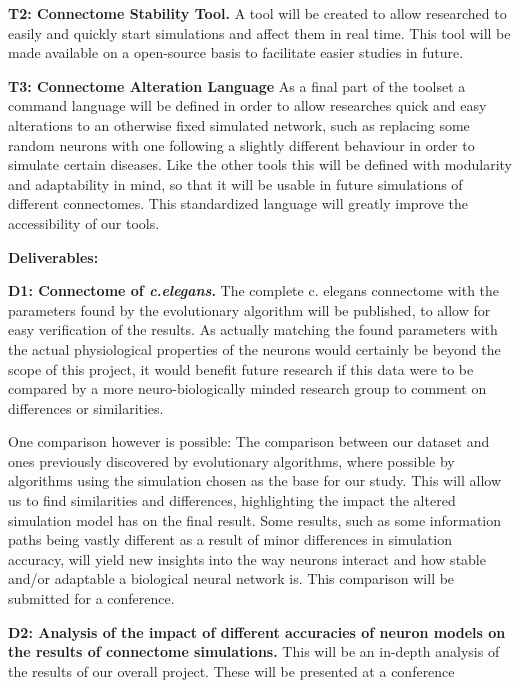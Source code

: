 \documentclass[a4paper,11pt]{article}
\begin{document}
\textbf{T2: Connectome Stability Tool.}
A tool will be created to allow researched to easily and quickly start simulations and affect them in real time. This tool will be made available on a open-source  basis to facilitate easier studies in future. 

\textbf{T3: Connectome Alteration Language}
As a final part of the toolset a command language will be defined in order to allow researches quick and easy alterations to an otherwise fixed simulated network, such as replacing some random neurons with one following a slightly different behaviour in order to simulate certain diseases. Like the other tools this will be defined with modularity and adaptability in mind, so that it will be usable in future simulations of different connectomes. This standardized language will greatly improve the accessibility of our tools.

\textbf{Deliverables:} 

\textbf{D1: Connectome of \emph{c.elegans}.}
The complete c. elegans connectome with the parameters found by the evolutionary algorithm will be published, to allow for easy verification of the results. As actually matching the found parameters with the actual physiological properties of the neurons would certainly be beyond the scope of this project, it would benefit future research if this data were to be compared by a more neuro-biologically minded research group to comment on differences or similarities. 

One comparison however is possible: The comparison between our dataset and ones previously discovered by evolutionary algorithms, where possible by algorithms using the simulation chosen as the base for our study. This will allow us to find similarities and differences, highlighting the impact the altered simulation model has on the final result. Some results, such as some information paths being vastly different as a result of minor differences in simulation accuracy, will yield new insights into the way neurons interact and how stable and/or adaptable a biological neural network is. This comparison will be submitted for a conference. 

\textbf{D2: Analysis of the impact of different accuracies of neuron models on the results of connectome simulations.} This will be an in-depth analysis of the results of our overall project. These will be presented at a conference  
\end{document}
